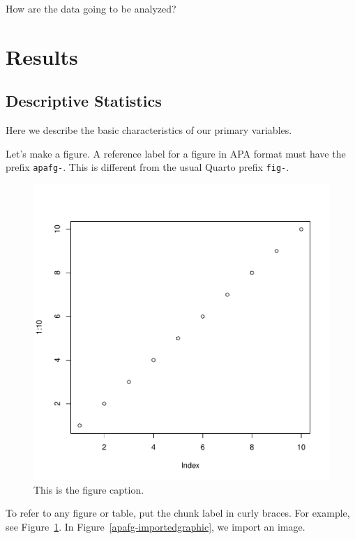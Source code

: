 \documentclass[
  jou,
  colorlinks=true,linkcolor=blue,citecolor=blue,urlcolor=blue]{apa7}
\begin{document}
How are the data going to be analyzed?

\hypertarget{results}{%
\section{Results}\label{results}}

\hypertarget{descriptive-statistics}{%
\subsection{Descriptive Statistics}\label{descriptive-statistics}}

Here we describe the basic characteristics of our primary variables.

Let's make a figure. A reference label for a figure in APA format must
have the prefix \texttt{apafg-}. This is different from the usual Quarto
prefix \texttt{fig-}.

\begin{figure}[h!]
\caption{This is the figure caption.}
\label{apafg-myplot}
\includegraphics[width=6.5 in]{bolin23_files/figure-pdf/apafg-myplot-1.pdf}




\end{figure}

To refer to any figure or table, put the chunk label in curly braces.
For example, see Figure~\ref{apafg-myplot}. In
Figure~\ref{apafg-importedgraphic}, we import an image.
\end{document}
